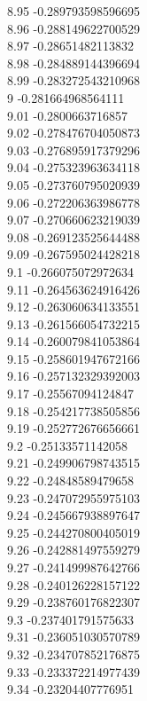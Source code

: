 {8.95	-0.289793598596695\\
8.96	-0.288149622700529\\
8.97	-0.28651482113832\\
8.98	-0.284889144396694\\
8.99	-0.283272543210968\\
9	-0.281664968564111\\
9.01	-0.2800663716857\\
9.02	-0.278476704050873\\
9.03	-0.276895917379296\\
9.04	-0.275323963634118\\
9.05	-0.273760795020939\\
9.06	-0.272206363986778\\
9.07	-0.270660623219039\\
9.08	-0.269123525644488\\
9.09	-0.267595024428218\\
9.1	-0.266075072972634\\
9.11	-0.264563624916426\\
9.12	-0.263060634133551\\
9.13	-0.261566054732215\\
9.14	-0.260079841053864\\
9.15	-0.258601947672166\\
9.16	-0.257132329392003\\
9.17	-0.25567094124847\\
9.18	-0.254217738505856\\
9.19	-0.252772676656661\\
9.2	-0.25133571142058\\
9.21	-0.249906798743515\\
9.22	-0.24848589479658\\
9.23	-0.247072955975103\\
9.24	-0.245667938897647\\
9.25	-0.244270800405019\\
9.26	-0.242881497559279\\
9.27	-0.241499987642766\\
9.28	-0.240126228157122\\
9.29	-0.238760176822307\\
9.3	-0.237401791575633\\
9.31	-0.236051030570789\\
9.32	-0.234707852176875\\
9.33	-0.233372214977439\\
9.34	-0.23204407776951\\
}

